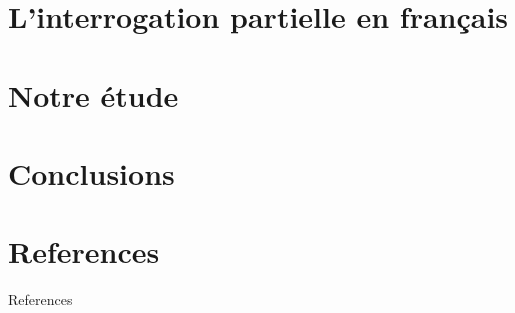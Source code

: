 \documentclass[aspectratio=169, sectionpages, codemintedoverleaf, bibref]{beamer}
\begin{document}
\section{L'interrogation partielle en français}




\section{Notre étude}





\section{Conclusions}


\section{References}

\begin{frame}[allowframebreaks]{References}

%
\printbibliography


%
\end{frame}
\end{document}
